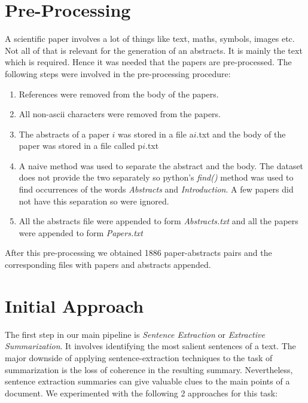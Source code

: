 \section{Pre-Processing}
A scientific paper involves a lot of things like text, maths, symbols, images etc. Not all of that is relevant for the generation of an abstracts. It is mainly the text which is required. Hence it was needed that the papers are pre-processed. The following steps were involved in the pre-processing procedure:
\begin{enumerate}
\item References were removed from the body of the papers.
\item All non-ascii characters were removed from the papers.
\item The abstracts of a paper $i$ was stored in a file a$i$.txt and the body of the paper was stored in a file called p$i$.txt 
\item A naive method was used to separate the abstract and the body. The dataset does not provide the two separately so python's \textit{find()} method was used to find occurrences of the words \textit{Abstracts} and \textit{Introduction}. A few papers did not have this separation so were ignored.
\item All the abstracts file were appended to form \textit{Abstracts.txt} and all the papers were appended to form \textit{Papers.txt}
\end{enumerate}
After this pre-processing we obtained 1886 paper-abstracts pairs and the corresponding files with papers and abstracts appended.

\section{Initial Approach}
The first step in our main pipeline is \textit{Sentence Extraction} or \textit{Extractive Summarization}. It involves identifying the most salient sentences of a text. The major downside of applying sentence-extraction techniques to the task of summarization is the loss of coherence in the resulting summary. Nevertheless, sentence extraction summaries can give valuable clues to the main points of a document. We experimented with the following 2 approaches for this task:
\newpage
